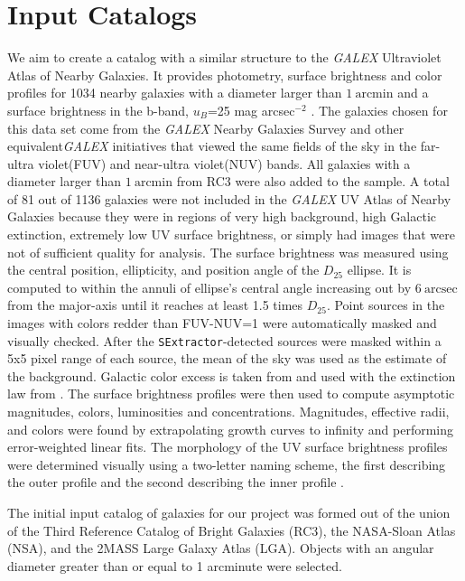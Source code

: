\documentclass[12pt,preprint,pdftex]{aastex}
\newcommand{\units}[1]{\mathrm{#1}}
\renewcommand{\arcmin}{\units{arcmin}}
\renewcommand{\arcsec}{\units{arcsec}}
\begin{document}
\section{Input Catalogs}
We aim to create a catalog with a similar structure to the
\textit{GALEX} Ultraviolet Atlas of Nearby Galaxies. It provides
photometry, surface brightness and color profiles for 1034 nearby
galaxies with a diameter larger than $1~\arcmin$ and a surface
brightness in the b-band, $u_B$=25 mag arcsec$^{-2}$ . The galaxies
chosen for this data set come from the \textit{GALEX} Nearby Galaxies
Survey and other equivalent\textit{GALEX} initiatives that viewed the
same fields of the sky in the far-ultra violet(FUV) and near-ultra
violet(NUV) bands. All galaxies with a diameter larger than
$1~\arcmin$ from RC3 were also added to the sample. A total of 81 out
of 1136 galaxies were not included in the \emph{GALEX} UV Atlas of
Nearby Galaxies because they were in regions of very high background,
high Galactic extinction, extremely low UV surface brightness, or
simply had images that were not of sufficient quality for
analysis. The surface brightness was measured using the central
position, ellipticity, and position angle of the $D_{25}$ ellipse. It is
computed to within the annuli of ellipse's central angle increasing
out by $6~\arcsec$ from the major-axis until it reaches at least 1.5
times $D_{25}$. Point sources in the images with colors redder than
FUV-NUV=1 were automatically masked and visually checked. After the
\verb|SExtractor|-detected\citep{sextractor} sources were masked within a 5x5 pixel
range of each source, the mean of the sky was used as the estimate of
the background. Galactic color excess is taken from
\cite{schlegel98} and used with the extinction law from
\cite{cardelli}. The surface brightness profiles were then used to
compute asymptotic magnitudes, colors, luminosities and
concentrations. Magnitudes, effective radii, and colors were found by
extrapolating growth curves to infinity and performing error-weighted
linear fits. The morphology of the UV surface brightness profiles were
determined visually using a two-letter naming scheme, the first
describing the outer profile and the second describing the inner
profile \citep{gdp06}.

The initial input catalog of galaxies for our project was formed out of the union of the Third
Reference Catalog of Bright Galaxies (RC3), the NASA-Sloan Atlas
(NSA), and the 2MASS Large Galaxy Atlas (LGA). Objects with an angular
diameter greater than or equal to 1 arcminute were selected. 
\end{document}
